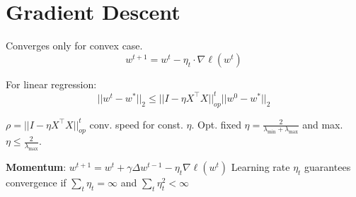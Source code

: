 \section*{Gradient Descent}
Converges only for convex case.
\[
	w^{t+1} = w^t - \eta_t \cdot \nabla \ell(w^t)
\]

For linear regression:
\[
	||w^t - w^*||_2 \leq ||I - \eta X^\top X||_{op}^t ||w^0 - w^*||_2
\]

$\rho = ||I - \eta X^\top X||_{op}^t$ conv. speed for const. $\eta$. Opt. fixed $\eta = \frac{2}{\lambda_{\text{min}} + \lambda_{\text{max}}}$ and max. $\eta \leq \frac{2}{\lambda_{\text{max}}}$. 

\textbf{Momentum}: $w^{t+1} = w^t + \gamma \Delta w^{t-1} - \eta_t \nabla \ell(w^t)$
Learning rate $\eta_t$ guarantees convergence if $\sum_t \eta_t = \infty$ and $\sum_t \eta_t^2 < \infty$
